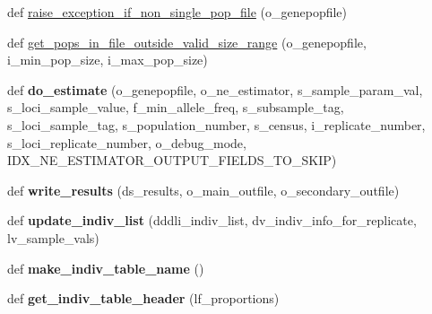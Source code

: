 \begin{DoxyCompactItemize}
\item 
def \hyperlink{namespacenegui_1_1pgdriveneestimator_ac98833013f11d6aa3544b0fc60951632}{raise\+\_\+exception\+\_\+if\+\_\+non\+\_\+single\+\_\+pop\+\_\+file} (o\+\_\+genepopfile)
\item 
def \hyperlink{namespacenegui_1_1pgdriveneestimator_ab546af99f06d3ec795da61f806ffafa9}{get\+\_\+pops\+\_\+in\+\_\+file\+\_\+outside\+\_\+valid\+\_\+size\+\_\+range} (o\+\_\+genepopfile, i\+\_\+min\+\_\+pop\+\_\+size, i\+\_\+max\+\_\+pop\+\_\+size)
\item 
def {\bfseries do\+\_\+estimate} (o\+\_\+genepopfile, o\+\_\+ne\+\_\+estimator, s\+\_\+sample\+\_\+param\+\_\+val, s\+\_\+loci\+\_\+sample\+\_\+value, f\+\_\+min\+\_\+allele\+\_\+freq, s\+\_\+subsample\+\_\+tag, s\+\_\+loci\+\_\+sample\+\_\+tag, s\+\_\+population\+\_\+number, s\+\_\+census, i\+\_\+replicate\+\_\+number, s\+\_\+loci\+\_\+replicate\+\_\+number, o\+\_\+debug\+\_\+mode, I\+D\+X\+\_\+\+N\+E\+\_\+\+E\+S\+T\+I\+M\+A\+T\+O\+R\+\_\+\+O\+U\+T\+P\+U\+T\+\_\+\+F\+I\+E\+L\+D\+S\+\_\+\+T\+O\+\_\+\+S\+K\+IP)\hypertarget{namespacenegui_1_1pgdriveneestimator_aee19b70baf85c140354fa63cc7071456}{}\label{namespacenegui_1_1pgdriveneestimator_aee19b70baf85c140354fa63cc7071456}

\item 
def {\bfseries write\+\_\+results} (ds\+\_\+results, o\+\_\+main\+\_\+outfile, o\+\_\+secondary\+\_\+outfile)\hypertarget{namespacenegui_1_1pgdriveneestimator_a97bd4891f7343e405094bdf307c7ee89}{}\label{namespacenegui_1_1pgdriveneestimator_a97bd4891f7343e405094bdf307c7ee89}

\item 
def {\bfseries update\+\_\+indiv\+\_\+list} (dddli\+\_\+indiv\+\_\+list, dv\+\_\+indiv\+\_\+info\+\_\+for\+\_\+replicate, lv\+\_\+sample\+\_\+vals)\hypertarget{namespacenegui_1_1pgdriveneestimator_a087de69842dbbb60eaad4e2f692a06c7}{}\label{namespacenegui_1_1pgdriveneestimator_a087de69842dbbb60eaad4e2f692a06c7}

\item 
def {\bfseries make\+\_\+indiv\+\_\+table\+\_\+name} ()\hypertarget{namespacenegui_1_1pgdriveneestimator_aba42585f01bf9ed8468c043e7f05e56a}{}\label{namespacenegui_1_1pgdriveneestimator_aba42585f01bf9ed8468c043e7f05e56a}

\item 
def {\bfseries get\+\_\+indiv\+\_\+table\+\_\+header} (lf\+\_\+proportions)\hypertarget{namespacenegui_1_1pgdriveneestimator_a8ea31f316844b96fb9ba5d9985b16ecc}{}\label{namespacenegui_1_1pgdriveneestimator_a8ea31f316844b96fb9ba5d9985b16ecc}


\end{DoxyCompactItemize}
